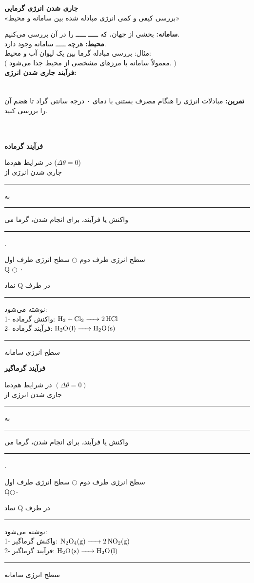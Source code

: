 \documentclass[a4paper,12pt]{article}
\newcommand{\ff}{\rule{1cm}{0.15mm}\;}
\begin{document}
	\newpage
	
	
	\begin{center}
		\textbf{جاری شدن انرژی گرمایی}
		\\
		«بررسی کیفی و کمی انرژی مبادله شده بین سامانه و محیط»
	\end{center}
	\textbf{سامانه:}
بخشی از جهان، که ـــــ ـــــ را در آن بررسی می‌کنیم.
	\\
	\textbf{محیط:}
هرچه ـــــ سامانه وجود دارد.\\
مثال: بررسی مبادله گرما بین یک لیوان آب و محیط:
\\
( معمولاً سامانه با مرز‌های مشخصی از محیط جدا می‌شود. )
\\
\textbf{فرآیند جاری شدن انرژی:}
\\
\\
\\
\textbf{تمرین:}
مبادلات انرژی را هنگام مصرف بستنی با دمای ۰ درجه سانتی گراد تا هضم آن را بررسی کنید.
\\
\\
\\
\begin{multicols}{2}
	\begin{center}
		\textbf{فرآیند گرماده}
	\end{center}
	\vfill\null
	در شرایط هم‌دما ($ \Delta\theta = 0$)\\
	جاری شدن انرژی از \ff به \ff واکنش یا فرآیند، برای انجام شدن، گرما می \ff .
	\begin{center}
		سطح انرژی طرف دوم $\bigcirc$ سطح انرژی طرف اول\\
		Q $\bigcirc$ ۰
	\end{center}
	نماد Q در طرف \ff نوشته می‌شود:\\
	1-
	واکنش گرماده:
	$\ce{H2 + Cl2 -> 2HCl}$\\
	2-
	فرآیند گرماده:
	$\ce{H2O(l) -> H2O(s)}$\\
	\ff سطح انرژی سامانه
	\vfill\null
	\columnbreak
	\begin{center}
		\textbf{فرآیند گرماگیر}
	\end{center}
	\vfill\null
	در شرایط هم‌دما $( \Delta\theta = 0 )$
	\\
	جاری شدن انرژی از \ff به \ff واکنش یا فرآیند، برای انجام شدن، گرما می ‌\ff .
	\begin{center}
			سطح انرژی طرف دوم	 $\bigcirc$ سطح انرژی طرف اول
			\\
			Q$\bigcirc$۰
	\end{center}

نماد Q در طرف \ff نوشته می‌شود:
\\
1-
واکنش گرما‌گیر: 
$\ce{N2O4(g) -> 2NO2(g)}$
\\
2-
فرآیند گرماگیر:
$\ce{H2O(s) -> H2O(l)}$
\ff سطح انرژی سامانه
	\vfill\null
\end{multicols}
\end{document}
